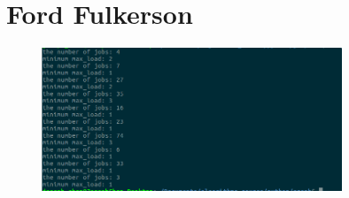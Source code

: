 \section{Ford Fulkerson}
 
\begin{figure}[H]
 \centering 
	\includegraphics[width = 0.8\textwidth,height = 0.2\textheight]{work5/load_balance}
\end{figure} 	 
